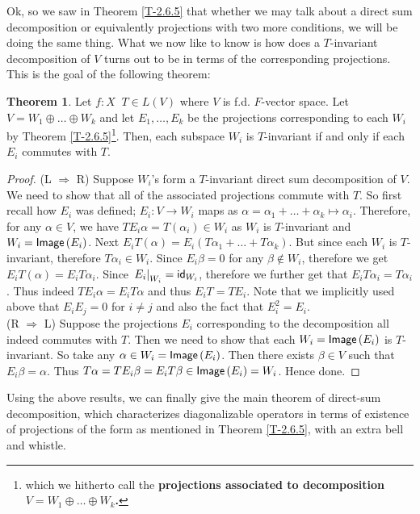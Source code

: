 \documentclass[letterpaper,11pt,twoside]{article}
\theoremstyle{definition}
\theoremstyle{definition}
\newtheorem{theorem}[proposition]{Theorem}
\theoremstyle{definition}
\theoremstyle{definition}
\theoremstyle{definition}
\theoremstyle{definition}
\theoremstyle{remark}
\theoremstyle{definition}
\newcommand{\Image}[1]{{\fontfamily{lmss}\selectfont 
		\text{Image}\left (#1\right )
}}
\newcommand{\rest}[2]{\left. { #1 }\right \vert_{#2}}
\newcommand{\id}[1]{{\fontfamily{lmss}\selectfont 
            \text{id}_{#1}
}}
\begin{document}
    Ok, so we saw in Theorem \ref{T-2.6.5} that whether we may talk about a direct sum decomposition or equivalently projections with two more conditions, we will be doing the same thing. What we now like to know is how does a $T$-invariant decomposition of $V$ turns out to be in terms of the corresponding projections. This is the goal of the following theorem:
    \begin{theorem}\label{T-2.7.1}
    Let $f : X \ $ $T\in L(V)$ where $V$ is f.d. $F$-vector space. Let $V = W_1\oplus \dots \oplus W_k$ and let $E_1,\dots,E_k$ be the projections corresponding to each $W_i$ by Theorem \ref{T-2.6.5}\footnote{which we hitherto call the \textbf{projections associated to decomposition $V=W_1\oplus \dots \oplus W_k$.}}. Then, each subspace $W_i$ is $T$-invariant if and only if each $E_i$ commutes with $T$.
    \end{theorem}
    \begin{proof}
    (L $\Rightarrow$ R) Suppose $W_i$'s form a $T$-invariant direct sum decomposition of $V$. We need to show that all of the associated projections commute with $T$. So first recall how $E_i$ was defined; $E_i : V\to W_i$ maps as $\alpha = \alpha_1+\dots+\alpha_k \mapsto \alpha_i$. Therefore, for any $\alpha\in V$, we have $TE_i \alpha = T(\alpha_i) \in W_i$ as $W_i$ is $T$-invariant and $W_i = \Image{E_i}$. Next $E_iT(\alpha) = E_i(T\alpha_1+\dots +T\alpha_k)$. But since each $W_i$ is $T$-invariant, therefore $T\alpha_i \in W_i$. Since $E_i\beta = 0$ for any $\beta\notin W_i$, therefore we get $E_i T(\alpha) = E_iT\alpha_i$. Since $\rest{E_i}{W_i} = \id{W_i}$, therefore we further get that $E_iT\alpha_i = T\alpha_i$. Thus indeed $TE_i\alpha = E_iT\alpha$ and thus $E_iT=TE_i$. Note that we implicitly used above that $E_iE_j = 0$ for $i\neq j$ and also the fact that $E_i^2 = E_i$.\\
    
    (R $\Rightarrow$ L) Suppose the projections $E_i$ corresponding to the decomposition all indeed commutes with $T$. Then we need to show that each $W_i = \Image{E_i}$ is $T$-invariant. So take any $\alpha\in W_i = \Image{E_i}$. Then there exists $\beta \in V$ such that $E_i\beta = \alpha$. Thus $T\alpha = TE_i\beta = E_iT\beta \in \Image{E_i} = W_i$. Hence done.
    \end{proof}
    Using the above results, we can finally give the main theorem of direct-sum decomposition, which characterizes diagonalizable operators in terms of existence of projections of the form as mentioned in Theorem \ref{T-2.6.5}, with an extra bell and whistle.
\end{document}
